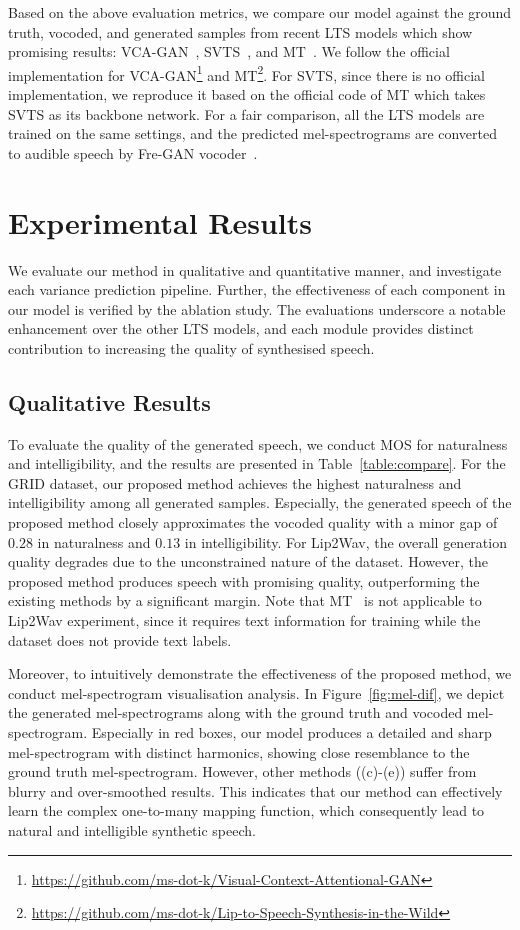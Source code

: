 \documentclass[letterpaper]{article} %
\begin{document}
Based on the above evaluation metrics, we compare our model against the ground truth, vocoded, and generated samples from recent LTS models which show promising results: VCA-GAN~\cite{kim2021lip}, SVTS~\cite{mira2022svts}, and MT~\cite{kim2023lip}.
We follow the official implementation for VCA-GAN\footnote{\url{https://github.com/ms-dot-k/Visual-Context-Attentional-GAN}} and MT\footnote{\url{https://github.com/ms-dot-k/Lip-to-Speech-Synthesis-in-the-Wild}}. For SVTS, since there is no official implementation, we reproduce it based on the official code of MT which takes SVTS as its backbone network.
For a fair comparison, all the LTS models are trained on the same settings, and the predicted mel-spectrograms are converted to audible speech by Fre-GAN vocoder~\cite{kim21f_interspeech}.

\section{Experimental Results}
We evaluate our method in qualitative and quantitative manner, and investigate each variance prediction pipeline. Further, the effectiveness of each component in our model is verified by the ablation study. The evaluations underscore a notable enhancement over the other LTS models, and each module provides distinct contribution to increasing the quality of synthesised speech.

\subsection{Qualitative Results}
To evaluate the quality of the generated speech, we conduct MOS for naturalness and intelligibility, and the results are presented in Table~\ref{table:compare}.
For the GRID dataset, our proposed method achieves the highest naturalness and intelligibility among all generated samples.
Especially, the generated speech of the proposed method closely approximates the vocoded quality with a minor gap of $0.28$ in naturalness and $0.13$ in intelligibility.
For Lip2Wav, the overall generation quality degrades due to the unconstrained nature of the dataset.
However, the proposed method produces speech with promising quality, outperforming the existing methods by a significant margin.
Note that MT~\cite{kim2023lip} is not applicable to Lip2Wav experiment, since it requires text information for training while the dataset does not provide text labels.

Moreover, to intuitively demonstrate the effectiveness of the proposed method, we conduct mel-spectrogram visualisation analysis.
In Figure~\ref{fig:mel-dif}, we depict the generated mel-spectrograms along with the ground truth and vocoded mel-spectrogram.
Especially in red boxes, our model produces a detailed and sharp mel-spectrogram with distinct harmonics, showing close resemblance to the ground truth mel-spectrogram.
However, other methods ((c)-(e)) suffer from blurry and over-smoothed results. This indicates that our method can effectively learn the complex one-to-many mapping function, which consequently lead to natural and intelligible synthetic speech.
\end{document}
